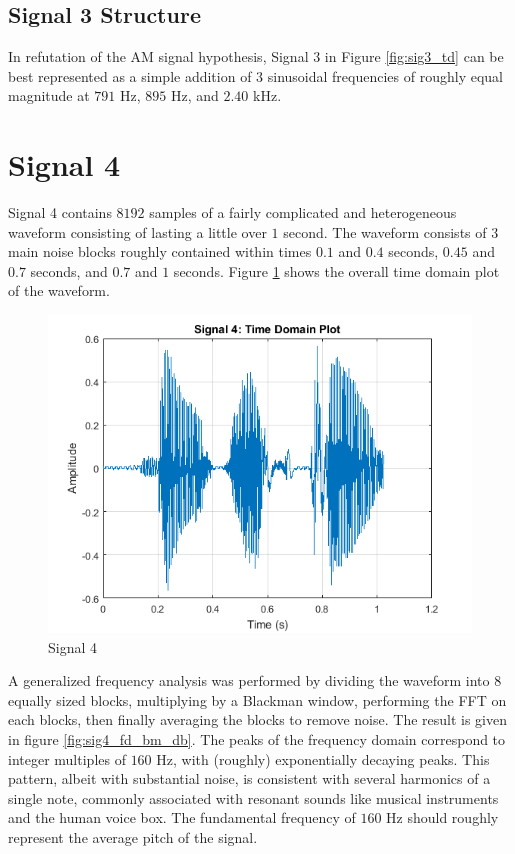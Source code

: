 \documentclass[pdftex, 10pt]{IEEEtran}
\begin{document}
\subsection{Signal 3 Structure}
In refutation of the AM signal hypothesis, Signal $3$ in Figure \ref{fig:sig3_td} can be best 
represented as a simple addition of $3$ sinusoidal frequencies of roughly equal magnitude at
$791$ Hz, $895$ Hz, and $2.40$ kHz.

\section{Signal 4}
Signal 4 contains $8192$ samples of a fairly complicated and heterogeneous waveform consisting of
lasting a little over $1$ second. The waveform consists of $3$ main noise blocks roughly contained
within times $0.1$ and $0.4$ seconds, $0.45$ and $0.7$ seconds, and $0.7$ and $1$ seconds. Figure
\ref{fig:sig4_td_all} shows the overall time domain plot of the waveform.

\begin{figure}
    \centering
    \includegraphics[scale=0.5]{sig4_td_all}
    \caption{Signal 4}
    \label{fig:sig4_td_all}
\end{figure}

A generalized frequency analysis was performed by dividing the waveform into 8 equally sized
blocks, multiplying by a Blackman window, performing the FFT on each blocks, then finally 
averaging the blocks to remove noise. The result is given in figure \ref{fig:sig4_fd_bm_db}. The peaks of the
frequency domain correspond to integer multiples of $160$ Hz, with (roughly) exponentially
decaying peaks. This pattern, albeit with substantial noise, is consistent with several harmonics
of a single note, commonly associated with resonant sounds like musical instruments and the human 
voice box. The fundamental frequency of $160$ Hz should roughly represent the average pitch
of the signal.
\end{document}
